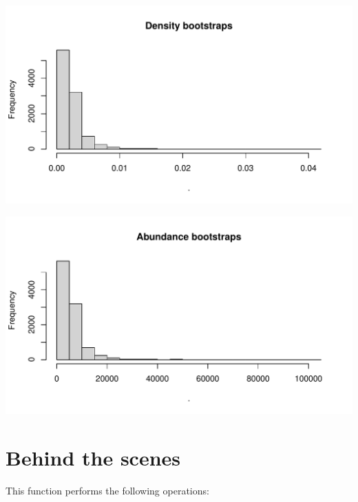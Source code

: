 \documentclass[
]{book}
\begin{document}
\includegraphics{figures/unnamed-chunk-309-1.pdf}

\includegraphics{figures/unnamed-chunk-310-1.pdf}

\hypertarget{behind-the-scenes-2}{%
\section*{Behind the scenes}\label{behind-the-scenes-2}}

This function performs the following operations:
\end{document}

